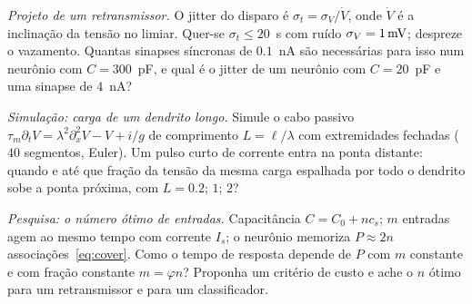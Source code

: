 \begin{exercise}[\lvlB]
\label{ex:19:5}
\emph{Projeto de um retransmissor.} O jitter do disparo é $\sigma_t=\sigma_V/\dot V$, onde $\dot V$ é a inclinação da tensão no limiar. Quer-se $\sigma_t\le20$~\textmu s com ruído $\sigma_V=1\,\text{mV}$; despreze o vazamento. Quantas sinapses síncronas de $0.1$~nA são necessárias para isso num neurônio com $C=300$~pF, e qual é o jitter de um neurônio com $C=20$~pF e uma sinapse de $4$~nA?
\end{exercise}

\begin{exercise}[\lvlB]
\label{ex:19:6}
\emph{Simulação: carga de um dendrito longo.} Simule o cabo passivo $\tau_m\partial_tV=\lambda^2\partial_x^2V-V+i/g$ de comprimento $L=\ell/\lambda$ com extremidades fechadas ($40$ segmentos, Euler). Um pulso curto de corrente entra na ponta distante: quando e até que fração da tensão da mesma carga espalhada por todo o dendrito sobe a ponta próxima, com $L=0.2$; $1$; $2$?
\end{exercise}

\begin{exercise}[\lvlC]
\label{ex:19:7}
\emph{Pesquisa: o número ótimo de entradas.} Capacitância $C=C_0+nc_s$; $m$ entradas agem ao mesmo tempo com corrente $I_s$; o neurônio memoriza $P\approx2n$ associações~\eqref{eq:cover}. Como o tempo de resposta depende de $P$ com $m$ constante e com fração constante $m=\varphi n$? Proponha um critério de custo e ache o $n$ ótimo para um retransmissor e para um classificador.
\end{exercise}
